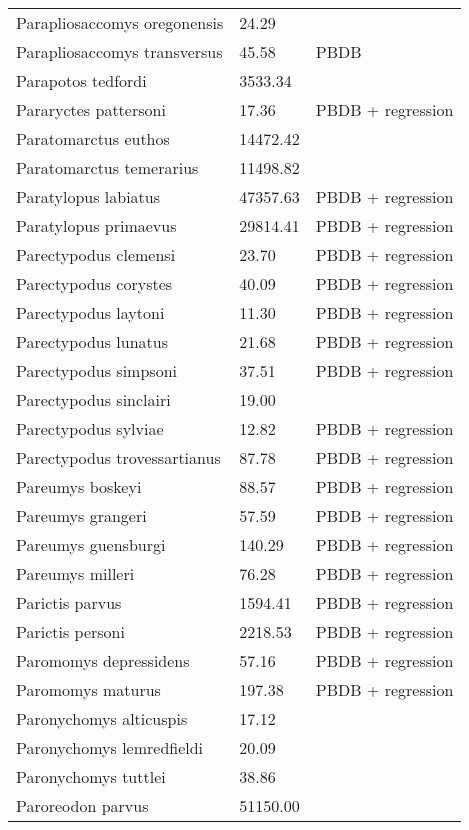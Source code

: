 \begin{center}
\begin{longtable}{p{} p{} p{} }
  Parapliosaccomys oregonensis & 24.29 & \cite{Tomiya2013} \\ 
  Parapliosaccomys transversus & 45.58 & PBDB \\ 
  Parapotos tedfordi & 3533.34 & \cite{Tomiya2013} \\ 
  Pararyctes pattersoni & 17.36 & PBDB + regression \\ 
  Paratomarctus euthos & 14472.42 & \cite{Tomiya2013} \\ 
  Paratomarctus temerarius & 11498.82 & \cite{Tomiya2013} \\ 
  Paratylopus labiatus & 47357.63 & PBDB + regression \\ 
  Paratylopus primaevus & 29814.41 & PBDB + regression \\ 
  Parectypodus clemensi & 23.70 & PBDB + regression \\ 
  Parectypodus corystes & 40.09 & PBDB + regression \\ 
  Parectypodus laytoni & 11.30 & PBDB + regression \\ 
  Parectypodus lunatus & 21.68 & PBDB + regression \\ 
  Parectypodus simpsoni & 37.51 & PBDB + regression \\ 
  Parectypodus sinclairi & 19.00 & \cite{Wilson2012} \\ 
  Parectypodus sylviae & 12.82 & PBDB + regression \\ 
  Parectypodus trovessartianus & 87.78 & PBDB + regression \\ 
  Pareumys boskeyi & 88.57 & PBDB + regression \\ 
  Pareumys grangeri & 57.59 & PBDB + regression \\ 
  Pareumys guensburgi & 140.29 & PBDB + regression \\ 
  Pareumys milleri & 76.28 & PBDB + regression \\ 
  Parictis parvus & 1594.41 & PBDB + regression \\ 
  Parictis personi & 2218.53 & PBDB + regression \\ 
  Paromomys depressidens & 57.16 & PBDB + regression \\ 
  Paromomys maturus & 197.38 & PBDB + regression \\ 
  Paronychomys alticuspis & 17.12 & \cite{Tomiya2013} \\ 
  Paronychomys lemredfieldi & 20.09 & \cite{Tomiya2013} \\ 
  Paronychomys tuttlei & 38.86 & \cite{Tomiya2013} \\ 
  Paroreodon parvus & 51150.00 & \cite{McKenna2011} \\ 

\end{longtable}
\end{center}

